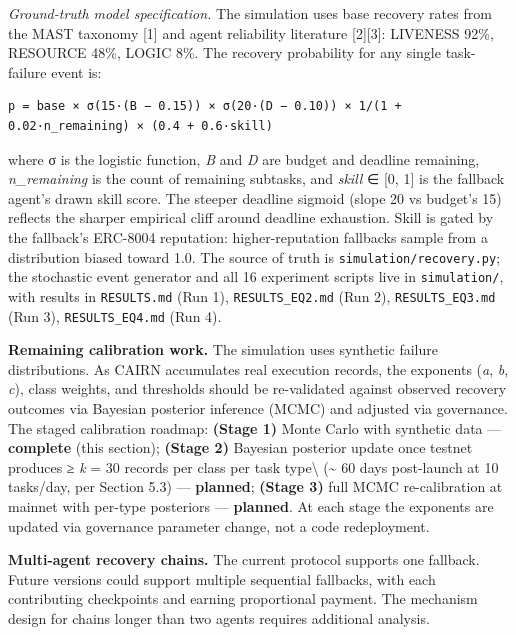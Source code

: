 \documentclass[
  10pt,
]{article}
\begin{document}
\emph{Ground-truth model specification.} The simulation uses base
recovery rates from the MAST taxonomy {[}1{]} and agent reliability
literature {[}2{]}{[}3{]}: LIVENESS 92\%, RESOURCE 48\%, LOGIC 8\%. The
recovery probability for any single task-failure event is:

\begin{verbatim}
p = base × σ(15·(B − 0.15)) × σ(20·(D − 0.10)) × 1/(1 + 0.02·n_remaining) × (0.4 + 0.6·skill)
\end{verbatim}

where σ is the logistic function, \emph{B} and \emph{D} are budget and
deadline remaining, \emph{n\_remaining} is the count of remaining
subtasks, and \emph{skill} ∈ {[}0, 1{]} is the fallback agent's drawn
skill score. The steeper deadline sigmoid (slope 20 vs budget's 15)
reflects the sharper empirical cliff around deadline exhaustion. Skill
is gated by the fallback's ERC-8004 reputation: higher-reputation
fallbacks sample from a distribution biased toward 1.0. The source of
truth is \texttt{simulation/recovery.py}; the stochastic event generator
and all 16 experiment scripts live in \texttt{simulation/}, with results
in \texttt{RESULTS.md} (Run 1), \texttt{RESULTS\_EQ2.md} (Run 2),
\texttt{RESULTS\_EQ3.md} (Run 3), \texttt{RESULTS\_EQ4.md} (Run 4).

\textbf{Remaining calibration work.} The simulation uses synthetic
failure distributions. As CAIRN accumulates real execution records, the
exponents (\emph{a}, \emph{b}, \emph{c}), class weights, and thresholds
should be re-validated against observed recovery outcomes via Bayesian
posterior inference (MCMC) and adjusted via governance. The staged
calibration roadmap: \textbf{(Stage 1)} Monte Carlo with synthetic data
--- \textbf{complete} (this section); \textbf{(Stage 2)} Bayesian
posterior update once testnet produces ≥ \emph{k} = 30 records per class
per task type\textbackslash{} (\textasciitilde{} 60 days post-launch at
10 tasks/day, per Section 5.3) --- \textbf{planned}; \textbf{(Stage 3)}
full MCMC re-calibration at mainnet with per-type posteriors ---
\textbf{planned}. At each stage the exponents are updated via governance
parameter change, not a code redeployment.

\textbf{Multi-agent recovery chains.} The current protocol supports one
fallback. Future versions could support multiple sequential fallbacks,
with each contributing checkpoints and earning proportional payment. The
mechanism design for chains longer than two agents requires additional
analysis.
\end{document}
